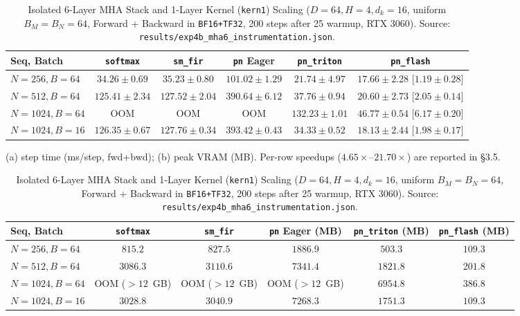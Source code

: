 \documentclass[11pt,a4paper]{article}
\begin{document}
\begin{table}[ht!]
\centering
\caption{Isolated 6-Layer MHA Stack and 1-Layer Kernel (\texttt{kern1}) Scaling ($D=64, H=4, d_k=16$, uniform $B_M=B_N=64$, Forward + Backward in \texttt{BF16+TF32}, 200 steps after 25 warmup, RTX 3060). Source: \texttt{results/exp4b\_mha6\_instrumentation.json}.}
\label{tab:exp4_mha}
\scriptsize
\setlength{\tabcolsep}{2.0pt}
\begin{tabular}{lccccc}
\toprule
Seq, Batch & \texttt{softmax} & \texttt{sm\_fir} & \texttt{pn} Eager & \textbf{\texttt{pn\_triton}} & \textbf{\texttt{pn\_flash}} \\
\midrule
$N=256, B=64$ & $34.26 \pm 0.69$ & $35.23 \pm 0.80$ & $101.02 \pm 1.29$ & $\mathbf{21.74 \pm 4.97}$ & $\mathbf{17.66 \pm 2.28}$ [$1.19 \pm 0.28$] \\
$N=512, B=64$ & $125.41 \pm 2.34$ & $127.52 \pm 2.04$ & $390.64 \pm 6.12$ & $\mathbf{37.76 \pm 0.94}$ & $\mathbf{20.60 \pm 2.73}$ [$2.05 \pm 0.14$] \\
$N=1024, B=64$ & OOM & OOM & OOM & $\mathbf{132.23 \pm 1.01}$ & $\mathbf{46.77 \pm 0.54}$ [$6.17 \pm 0.20$] \\
$N=1024, B=16$ & $126.35 \pm 0.67$ & $127.76 \pm 0.34$ & $393.42 \pm 0.43$ & $\mathbf{34.33 \pm 0.52}$ & $\mathbf{18.13 \pm 2.44}$ [$1.98 \pm 0.17$] \\
\bottomrule
\end{tabular}
\vspace{0.5em}
{\footnotesize (a) step time (ms/step, fwd+bwd); (b) peak VRAM (MB). Per-row speedups ($4.65\times$--$21.70\times$) are reported in \S3.5.}
\vspace{0.5em}
\setlength{\tabcolsep}{2.6pt}
\begin{tabular}{lccccc}
\toprule
Seq, Batch & \texttt{softmax} & \texttt{sm\_fir} & \texttt{pn} Eager (MB) & \textbf{\texttt{pn\_triton}} (MB) & \textbf{\texttt{pn\_flash}} (MB) \\
\midrule
$N=256, B=64$ & $815.2$ & $827.5$ & $1886.9$ & $\mathbf{503.3}$ & $\mathbf{109.3}$ \\
$N=512, B=64$ & $3086.3$ & $3110.6$ & $7341.4$ & $\mathbf{1821.8}$ & $\mathbf{201.8}$ \\
$N=1024, B=64$ & OOM ($>12$~GB) & OOM ($>12$~GB) & OOM ($>12$~GB) & $\mathbf{6954.8}$ & $\mathbf{386.8}$ \\
$N=1024, B=16$ & $3028.8$ & $3040.9$ & $7268.3$ & $\mathbf{1751.3}$ & $\mathbf{109.3}$ \\
\bottomrule
\end{tabular}
\end{table}
\end{document}
